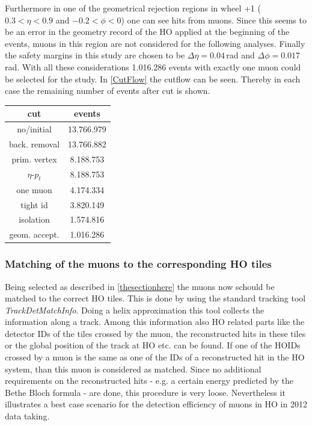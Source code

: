 			Furthermore in one of the geometrical rejection regions in wheel +1 ($0.3<\eta<0.9$ and $-0.2<\phi<0$) one can see hits from muons.
			Since this seems to be an error in the geometry record of the HO applied at the beginning of the events, muons in this region are not considered for the following analyses.
			Finally the safety margins in this study are chosen to be $\Delta\eta = 0.04$\,rad and $\Delta\phi = 0.017$\,rad.
			With all these considerations 1.016.286 events with exactly one muon could be selected for the study.
			In \ref{CutFlow} the cutflow can be seen.
			Thereby in each case the remaining number of events after cut is shown.
			\begin{center}
			\label{CutFlow}
				\begin{tabular}{|c|c|}
					\hline
					\textbf{cut}  & \textbf{events} \\ \hline \hline
			 		no/initial    & 13.766.979 		\\ \hline
			 		back. removal & 13.766.882 		\\ \hline
			 		prim. vertex  &  8.188.753 		\\ \hline
			 		$\eta$-$p_t$  &  8.188.753 		\\ \hline
			 		one muon      &  4.174.334 		\\ \hline
			 		tight id      &  3.820.149 		\\ \hline
			 		isolation     &  1.574.816 		\\ \hline
			 		geom. accept. &  1.016.286 		\\ \hline
				\end{tabular}
			\end{center}
		\subsubsection{Matching of the muons to the corresponding HO tiles}
			Being selected as described in \ref{thesectionhere} the muons now schould be matched to the correct HO tiles.
			This is done by using the standard tracking tool \textit{TrackDetMatchInfo}.
			Doing a helix approximation this tool collects the information along a track.
			Among this information also HO related parts like the detector IDs of the tiles crossed by the muon, the reconstructed hits in these tiles or the global position of the track at HO etc. can be
			found.
			If one of the HOIDs crossed by a muon is the same as one of the IDs of a reconstructed hit in the HO system, than this muon is considered as matched.
			Since no additional requirements on the reconstructed hits - e.g. a certain energy predicted by the Bethe Bloch formula - are done, this procedure is very loose.
			Nevertheless it illustrates a best case scenario for the detection efficiency of muons in HO in 2012 data taking.
